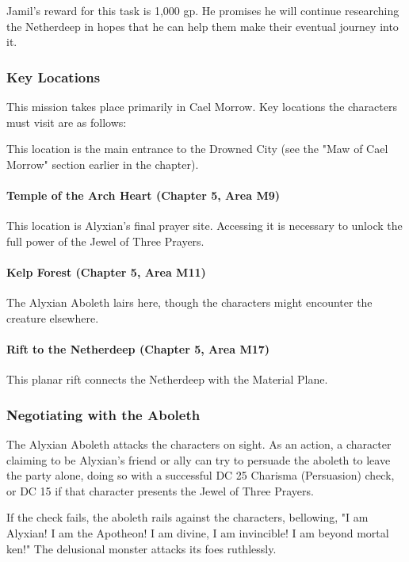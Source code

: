 \documentclass[10pt,a4paper,twoside,twocolumn,openany,nodeprecatedcode]{dndbook}
\begin{document}
Jamil's reward for this task is 1,000 gp. He promises he will continue researching the Netherdeep in hopes that he can help them make their eventual journey into it.

\subsubsection{Key Locations}
This mission takes place primarily in Cael Morrow. Key locations the characters must visit are as follows:


\begin{description}[nolistsep]
\item[Maw of Cael Morrow.]
This location is the main entrance to the Drowned City (see the "Maw of Cael Morrow" section earlier in the chapter).
\end{description}

\paragraph{Temple of the Arch Heart (Chapter 5, Area M9)}
This location is Alyxian's final prayer site. Accessing it is necessary to unlock the full power of the Jewel of Three Prayers.

\paragraph{Kelp Forest (Chapter 5, Area M11)}
The Alyxian Aboleth lairs here, though the characters might encounter the creature elsewhere.

\paragraph{Rift to the Netherdeep (Chapter 5, Area M17)}
This planar rift connects the Netherdeep with the Material Plane.

\subsubsection{Negotiating with the Aboleth}
The Alyxian Aboleth attacks the characters on sight. As an action, a character claiming to be Alyxian's friend or ally can try to persuade the aboleth to leave the party alone, doing so with a successful DC 25 Charisma (Persuasion) check, or DC 15 if that character presents the Jewel of Three Prayers.

If the check fails, the aboleth rails against the characters, bellowing, "I am Alyxian! I am the Apotheon! I am divine, I am invincible! I am beyond mortal ken!" The delusional monster attacks its foes ruthlessly.
\end{document}
